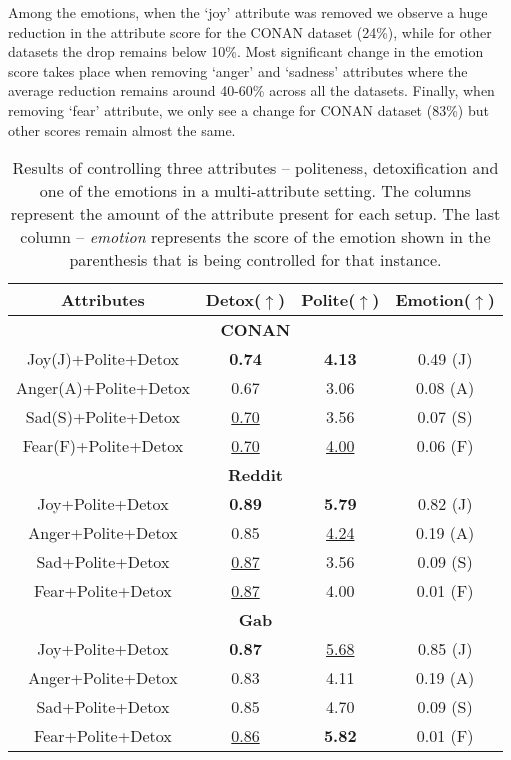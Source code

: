 Among the emotions, when the `joy' attribute was removed we observe a huge reduction in the attribute score for the CONAN dataset (24\%), while for other datasets the drop remains below 10\%. Most significant change in the emotion score takes place when removing `anger' and `sadness' attributes where the average reduction remains around 40-60\% across all the datasets. Finally, when removing `fear' attribute, we only see a change for CONAN dataset (83\%) but other scores remain almost the same. \fi

\begin{table}[h!]
\scriptsize
\centering
\begin{tabular}{|c|c|c|c|}
\hline
\textbf{Attributes}          & \textbf{Detox}($\uparrow$)         & \textbf{Polite}($\uparrow$)        & \textbf{Emotion}($\uparrow$)\\ \hline
\multicolumn{4}{|c|}{\textbf{CONAN}}                                   \\ \hline
Joy(J)+Polite+Detox    &   \textbf{0.74}     &  \textbf{4.13}               & 0.49 (J)       \\ \hline
Anger(A)+Polite+Detox  &    0.67             &  3.06                         & 0.08 (A)      \\ \hline
Sad(S)+Polite+Detox   &   \underline{0.70}   &  3.56                        & 0.07 (S)       \\ \hline
Fear(F)+Polite+Detox  &    \underline{0.70}  &  \underline{4.00}            & 0.06 (F)       \\ \hline

\multicolumn{4}{|c|}{\textbf{Reddit}}                                   \\ \hline
Joy+Polite+Detox    &  \textbf{0.89}     & \textbf{5.79} & 0.82 (J)      \\ \hline
Anger+Polite+Detox  &  0.85              & \underline{4.24}             & 0.19 (A)      \\ \hline
Sad+Polite+Detox   &   \underline{0.87}  & 3.56             & 0.09 (S)       \\ \hline
Fear+Polite+Detox  &  \underline{0.87}   & 4.00             & 0.01 (F)       \\ \hline
\multicolumn{4}{|c|}{\textbf{Gab}}                                   \\ \hline
Joy+Polite+Detox    & \textbf{0.87}        & \underline{5.68}             &  0.85 (J)\\ \hline
Anger+Polite+Detox  & 0.83      & 4.11             &  0.19 (A) \\ \hline
Sad+Polite+Detox    & 0.85     & 4.70             & 0.09 (S) \\ \hline
Fear+Polite+Detox   & \underline{0.86}      & \textbf{5.82} & 0.01 (F) \\ \hline
\end{tabular}
\caption{\scriptsize{Results of controlling three attributes -- politeness, detoxification and one of the emotions in a multi-attribute setting. The columns represent the amount of the attribute present for each setup. The last column -- \textit{emotion} represents the score of the emotion shown in the parenthesis that is being controlled for that instance.}}
\label{tab:multi-attribute}
\end{table}

